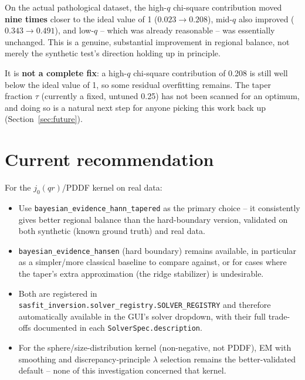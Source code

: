 \documentclass[11pt,a4paper]{article}
\begin{document}
On the actual pathological dataset, the high-$q$ chi-square
contribution moved \textbf{nine times} closer to the ideal value of 1
($0.023 \to 0.208$), mid-$q$ also improved ($0.343 \to 0.491$), and
low-$q$ -- which was already reasonable -- was essentially unchanged.
This is a genuine, substantial improvement in regional balance, not
merely the synthetic test's direction holding up in principle.

It is \textbf{not a complete fix}: a high-$q$ chi-square contribution
of 0.208 is still well below the ideal value of 1, so some residual
overfitting remains. The taper fraction $\tau$ (currently a fixed,
untuned 0.25) has not been scanned for an optimum, and doing so is a
natural next step for anyone picking this work back up
(Section~\ref{sec:future}).

\section{Current recommendation}

For the $j_0(qr)$/PDDF kernel on real data:
\begin{itemize}[nosep]
  \item Use \texttt{bayesian\_evidence\_hann\_tapered} as the primary
    choice -- it consistently gives better regional balance than the
    hard-boundary version, validated on both synthetic (known ground
    truth) and real data.
  \item \texttt{bayesian\_evidence\_hansen} (hard boundary) remains
    available, in particular as a simpler/more classical baseline to
    compare against, or for cases where the taper's extra
    approximation (the ridge stabilizer) is undesirable.
  \item Both are registered in
    \texttt{sasfit\_inversion.solver\_registry.SOLVER\_REGISTRY} and
    therefore automatically available in the GUI's solver dropdown,
    with their full trade-offs documented in each
    \texttt{SolverSpec.description}.
  \item For the sphere/size-distribution kernel (non-negative, not
    PDDF), EM with smoothing and discrepancy-principle $\lambda$
    selection remains the better-validated default -- none of this
    investigation concerned that kernel.
\end{itemize}

\end{document}

